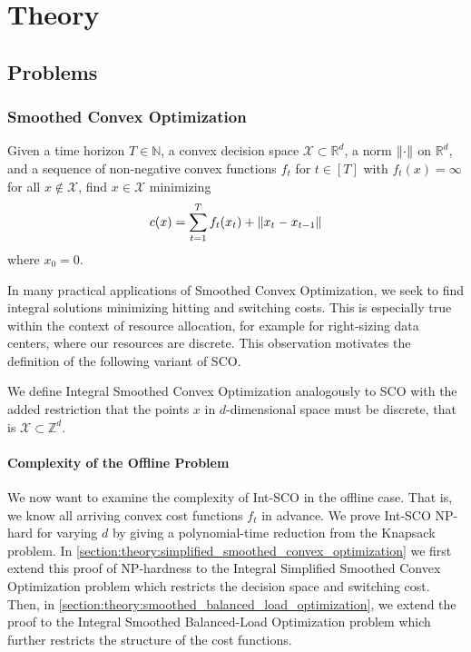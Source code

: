 
\chapter{Theory}\label{chapter:theory}

\section{Problems}

\subsection{Smoothed Convex Optimization}

\begin{problem}
Given a time horizon $T \in \mathbb{N}$, a convex decision space $\mathcal{X} \subset \mathbb{R}^d$, a norm $\lVert\cdot\rVert$ on $\mathbb{R}^d$, and a sequence of non-negative convex functions $f_t$ for $t \in [T]$ with $f_t(x) = \infty$ for all $x \not\in \mathcal{X}$, find $x \in \mathcal{X}$ minimizing \begin{align*}
    c(x) = \sum_{t=1}^T f_t(x_t) + \lVert x_t - x_{t-1}\rVert
\end{align*}
where $x_0 = 0$.
\end{problem}

In many practical applications of Smoothed Convex Optimization, we seek to find integral solutions minimizing hitting and switching costs. This is especially true within the context of resource allocation, for example for right-sizing data centers, where our resources are discrete. This observation motivates the definition of the following variant of SCO.

\begin{problem}
We define Integral Smoothed Convex Optimization analogously to SCO with the added restriction that the points $x$ in $d$-dimensional space must be discrete, that is $\mathcal{X} \subset \mathbb{Z}^d$.
\end{problem}

\subsubsection{Complexity of the Offline Problem}

We now want to examine the complexity of Int-SCO in the offline case. That is, we know all arriving convex cost functions $f_t$ in advance. We prove Int-SCO NP-hard for varying $d$ by giving a polynomial-time reduction from the Knapsack problem. In \autoref{section:theory:simplified_smoothed_convex_optimization} we first extend this proof of NP-hardness to the Integral Simplified Smoothed Convex Optimization problem which restricts the decision space and switching cost. Then, in \autoref{section:theory:smoothed_balanced_load_optimization}, we extend the proof to the Integral Smoothed Balanced-Load Optimization problem which further restricts the structure of the cost functions.

